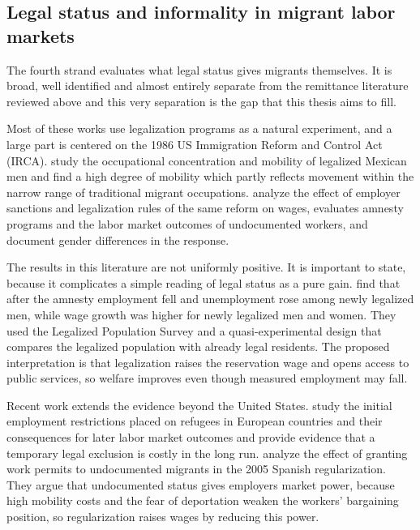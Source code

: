 \subsection{Legal status and informality in migrant labor markets}\label{sec:2-4}

The fourth strand evaluates what legal status gives migrants themselves. It is broad, well identified and almost entirely separate from the remittance literature reviewed above and this very separation is the gap that this thesis aims to fill.

Most of these works use legalization programs as a natural experiment, and a large part is centered on the 1986 US Immigration Reform and Control Act (IRCA). \cite{kossoudji2000} study the occupational concentration and mobility of legalized Mexican men and find a high degree of mobility which partly reflects movement within the narrow range of traditional migrant occupations. \cite{cobbclark1995} analyze the effect of employer sanctions and legalization rules of the same reform on wages, \cite{kaushal2006} evaluates amnesty programs and the labor market outcomes of undocumented workers, and \cite{amuedodorantes2007} document gender differences in the response.

The results in this literature are not uniformly positive. It is important to state, because it complicates a simple reading of legal status as a pure gain. \cite{amuedodorantes2011} find that after the amnesty employment fell and unemployment rose among newly legalized men, while wage growth was higher for newly legalized men and women. They used the Legalized Population Survey and a quasi-experimental design that compares the legalized population with already legal residents. The proposed interpretation is that legalization raises the reservation wage and opens access to public services, so welfare improves even though measured employment may fall.

Recent work extends the evidence beyond the United States. \cite{fasani2021} study the initial employment restrictions placed on refugees in European countries and their consequences for later labor market outcomes and provide evidence that a temporary legal exclusion is costly in the long run. \cite{elias2025} analyze the effect of granting work permits to undocumented migrants in the 2005 Spanish regularization. They argue that undocumented status gives employers market power, because high mobility costs and the fear of deportation weaken the workers' bargaining position, so regularization raises wages by reducing this power.

